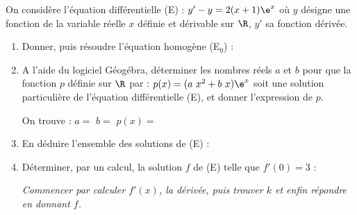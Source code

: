On considère l’équation différentielle (E) : $y' - y = 2(x + 1)\e^x$ où $y$ désigne une fonction de la variable réelle $x$ définie et dérivable sur $\R$, $y'$ sa fonction dérivée.

\begin{enumerate}
	\item Donner, puis résoudre l'équation homogène (E$_0$) :\sautp
	
	\item A l’aide du logiciel Géogébra, déterminer les nombres réels $a$ et $b$ pour que la fonction $p$ définie sur $\R$ par : $p(x) = (a~x^2+b~x)\e^x$ soit une solution particulière de l'équation différentielle (E), et donner l’expression de $p$. 

	
	On trouve : \hfill $a=$\makebox[0.1\linewidth]{\dotfill} \hfill $b=$\makebox[0.1\linewidth]{\dotfill} \hfill $p(x)=$\makebox[0.3\linewidth]{\dotfill}

	\smallskip
	
	\appelprof
	
	\item En déduire l'ensemble des solutions de (E) : \sautp
	
	\item Déterminer, par un calcul, la solution $f$ de (E) telle que $f'(0)=3$ : 
	
	{\it Commencer par calculer $f'(x)$, la dérivée, puis trouver $k$ et enfin répondre en donnant $f$.}\sautp
	

\end{enumerate}